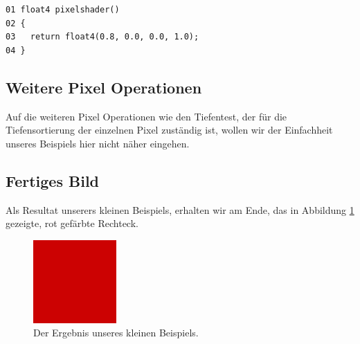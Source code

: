 \begin{Spacing}{\mylinespace}
\begin{lstlisting}[captionpos=b, caption=Fragment Shader unseres Rechtecks., label=pixelshader]
01 float4 pixelshader()
02 {
03   return float4(0.8, 0.0, 0.0, 1.0);
04 }
\end{lstlisting}

\subsection{Weitere Pixel Operationen}
Auf die weiteren Pixel Operationen wie den Tiefentest, der für die Tiefensortierung der einzelnen Pixel zuständig ist, wollen wir der Einfachheit unseres Beispiels hier nicht näher eingehen.

\subsection{Fertiges Bild}
Als Resultat unserers kleinen Beispiels, erhalten wir am Ende, das in Abbildung \ref{fig:exampleRes} gezeigte, rot gefärbte Rechteck.

\begin{figure}[h!]
	\vspace*{15px}
	\centering
	\includegraphics[height=120px]{graphics/exampleRes.png}	
	\caption{Der Ergebnis unseres kleinen Beispiels.}
	\label{fig:exampleRes}
\end{figure}

\end{Spacing}
\clearpage

